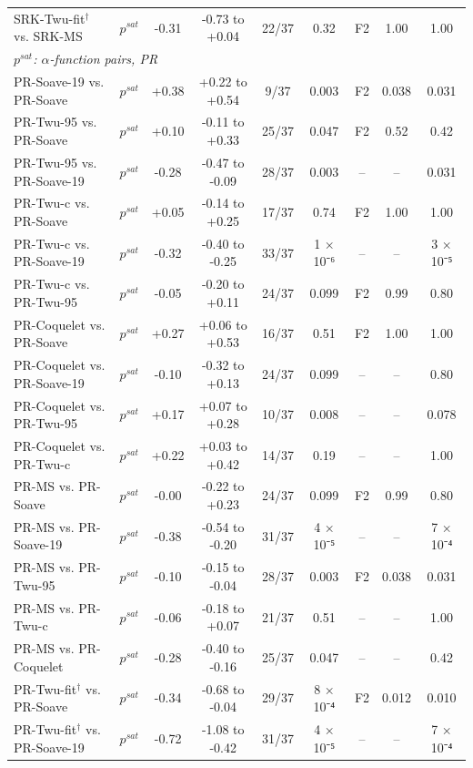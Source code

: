 \begin{table}[H]
\begin{tabular}{llccccccc}
SRK-Twu-fit$^{\dagger}$ vs. SRK-MS & $p^{sat}$ & -0.31 & -0.73 to +0.04 & 22/37 & 0.32 & F2 & 1.00 & 1.00 \\
\multicolumn{9}{l}{\emph{$p^{sat}$: $\alpha$-function pairs, PR}} \\
PR-Soave-19 vs. PR-Soave & $p^{sat}$ & +0.38 & +0.22 to +0.54 & 9/37 & 0.003 & F2 & 0.038 & 0.031 \\
PR-Twu-95 vs. PR-Soave & $p^{sat}$ & +0.10 & -0.11 to +0.33 & 25/37 & 0.047 & F2 & 0.52 & 0.42 \\
PR-Twu-95 vs. PR-Soave-19 & $p^{sat}$ & -0.28 & -0.47 to -0.09 & 28/37 & 0.003 & -- & -- & 0.031 \\
PR-Twu-c vs. PR-Soave & $p^{sat}$ & +0.05 & -0.14 to +0.25 & 17/37 & 0.74 & F2 & 1.00 & 1.00 \\
PR-Twu-c vs. PR-Soave-19 & $p^{sat}$ & -0.32 & -0.40 to -0.25 & 33/37 & 1 × 10⁻⁶ & -- & -- & 3 × 10⁻⁵ \\
PR-Twu-c vs. PR-Twu-95 & $p^{sat}$ & -0.05 & -0.20 to +0.11 & 24/37 & 0.099 & F2 & 0.99 & 0.80 \\
PR-Coquelet vs. PR-Soave & $p^{sat}$ & +0.27 & +0.06 to +0.53 & 16/37 & 0.51 & F2 & 1.00 & 1.00 \\
PR-Coquelet vs. PR-Soave-19 & $p^{sat}$ & -0.10 & -0.32 to +0.13 & 24/37 & 0.099 & -- & -- & 0.80 \\
PR-Coquelet vs. PR-Twu-95 & $p^{sat}$ & +0.17 & +0.07 to +0.28 & 10/37 & 0.008 & -- & -- & 0.078 \\
PR-Coquelet vs. PR-Twu-c & $p^{sat}$ & +0.22 & +0.03 to +0.42 & 14/37 & 0.19 & -- & -- & 1.00 \\
PR-MS vs. PR-Soave & $p^{sat}$ & -0.00 & -0.22 to +0.23 & 24/37 & 0.099 & F2 & 0.99 & 0.80 \\
PR-MS vs. PR-Soave-19 & $p^{sat}$ & -0.38 & -0.54 to -0.20 & 31/37 & 4 × 10⁻⁵ & -- & -- & 7 × 10⁻⁴ \\
PR-MS vs. PR-Twu-95 & $p^{sat}$ & -0.10 & -0.15 to -0.04 & 28/37 & 0.003 & F2 & 0.038 & 0.031 \\
PR-MS vs. PR-Twu-c & $p^{sat}$ & -0.06 & -0.18 to +0.07 & 21/37 & 0.51 & -- & -- & 1.00 \\
PR-MS vs. PR-Coquelet & $p^{sat}$ & -0.28 & -0.40 to -0.16 & 25/37 & 0.047 & -- & -- & 0.42 \\
PR-Twu-fit$^{\dagger}$ vs. PR-Soave & $p^{sat}$ & -0.34 & -0.68 to -0.04 & 29/37 & 8 × 10⁻⁴ & F2 & 0.012 & 0.010 \\
PR-Twu-fit$^{\dagger}$ vs. PR-Soave-19 & $p^{sat}$ & -0.72 & -1.08 to -0.42 & 31/37 & 4 × 10⁻⁵ & -- & -- & 7 × 10⁻⁴ \\

\end{tabular}
\end{table}

